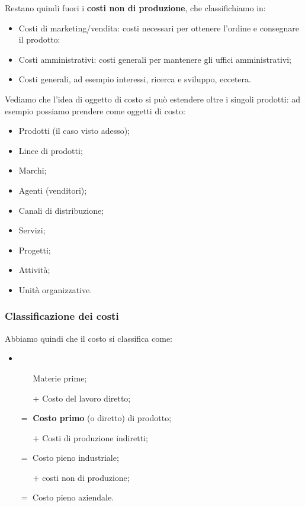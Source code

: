 \documentclass[a4paper,11pt]{article}
\begin{document}
Restano quindi fuori i \textbf{costi non di produzione}, che classifichiamo in:
\begin{itemize}
	\item Costi di marketing/vendita: costi necessari per ottenere l'ordine e consegnare il prodotto:
	\item Costi amministrativi: costi generali per mantenere gli uffici amministrativi;
	\item Costi generali, ad esempio interessi, ricerca e sviluppo, eccetera.
\end{itemize}

\par\smallskip

Vediamo che l'idea di oggetto di costo si può estendere oltre i singoli prodotti: ad esempio possiamo prendere come oggetti di costo:
\begin{itemize}
	\item Prodotti (il caso visto adesso);
	\item Linee di prodotti;
	\item Marchi;
	\item Agenti (venditori);
	\item Canali di distribuzione;
	\item Servizi;
	\item Progetti;
	\item Attività;
	\item Unità organizzative.
\end{itemize}

\subsubsection{Classificazione dei costi}

Abbiamo quindi che il costo si classifica come:
\begin{itemize}
	\item
	\begin{itemize}
		\item[] Materie prime;
		\item[$+$] Costo del lavoro diretto;
	\end{itemize}
	$=$ \textbf{Costo primo} (o diretto) di prodotto;
	\begin{itemize}
		\item[$+$] Costi di produzione indiretti;
	\end{itemize}
	$=$ Costo pieno industriale;
	\begin{itemize}
		\item[$+$] costi non di produzione;
	\end{itemize}
	$=$ Costo pieno aziendale.
\end{itemize}
\end{document}
